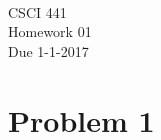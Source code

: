 \documentclass[11pt]{article}
\newcommand{\course}{CSCI 441}
\newcommand{\proj}{Homework 01}
\newcommand{\dueDate}{1-1-2017}
\begin{document}
{\Large ~\\
    \course \\ 
    \proj \\ 
    Due \dueDate
}

\section*{Problem 1}
\end{document}
